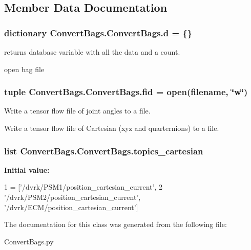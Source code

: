 \subsection{Member Data Documentation}
\hypertarget{classConvertBags_1_1ConvertBags_a615b423c353271da9d8372a2227e6d74}{
\subsubsection[{d}]{\setlength{\rightskip}{0pt plus 5cm}dictionary Convert\-Bags.\-Convert\-Bags.\-d = \{\}\hspace{0.3cm}{\ttfamily [static]}}}\label{classConvertBags_1_1ConvertBags_a615b423c353271da9d8372a2227e6d74}


returns database variable with all the data and a count. 

open bag file\hypertarget{classConvertBags_1_1ConvertBags_a2628e3b073f3ab23e352246cef6e7888}{
\subsubsection[{fid}]{\setlength{\rightskip}{0pt plus 5cm}tuple Convert\-Bags.\-Convert\-Bags.\-fid = open(filename, \char`\"{}w\char`\"{})\hspace{0.3cm}{\ttfamily [static]}}}\label{classConvertBags_1_1ConvertBags_a2628e3b073f3ab23e352246cef6e7888}


Write a tensor flow file of joint angles to a file. 

Write a tensor flow file of Cartesian (xyz and quarternions) to a file.\hypertarget{classConvertBags_1_1ConvertBags_a7872a5a4c775b7e9749f639ac111c234}{
\subsubsection[{topics\-\_\-cartesian}]{\setlength{\rightskip}{0pt plus 5cm}list Convert\-Bags.\-Convert\-Bags.\-topics\-\_\-cartesian\hspace{0.3cm}{\ttfamily [static]}}}\label{classConvertBags_1_1ConvertBags_a7872a5a4c775b7e9749f639ac111c234}
{\bfseries Initial value\-:}
\begin{DoxyCode}
1 = [\textcolor{stringliteral}{'/dvrk/PSM1/position\_cartesian\_current'}, 
2             \textcolor{stringliteral}{'/dvrk/PSM2/position\_cartesian\_current'}, \textcolor{stringliteral}{'/dvrk/ECM/position\_cartesian\_current'}]
\end{DoxyCode}


The documentation for this class was generated from the following file\-:\begin{DoxyCompactItemize}
\item 
Convert\-Bags.\-py\end{DoxyCompactItemize}
